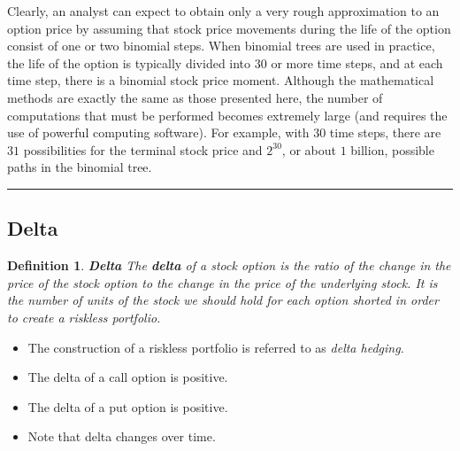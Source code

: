 \documentclass[letterpaper,10pt]{article}
\newtheorem{df}{Definition}[section]
\begin{document}
Clearly, an analyst can expect to obtain only a very rough approximation to an option price by assuming that stock price movements during the life of the option consist of one or two binomial steps. When binomial trees are used in practice, the life of the option is typically divided into $30$ or more time steps, and at each time step, there is a binomial stock price moment.  Although the mathematical methods are exactly the same as those presented here, the number of computations that must be performed becomes extremely large (and requires the use of powerful computing software).  For example, with $30$ time steps, there are $31$ possibilities for the terminal stock price and $2^{30}$, or about $1$ billion, possible paths in the binomial tree.

\bigskip

\hrule

\bigskip

\subsection{Delta}

\begin{df}{\bf Delta}
The {\bf delta} of a stock option is the ratio of the change in the price of the stock option to the change in the price of the underlying stock.  It is the number of units of the stock we should hold for each option shorted in order to create a riskless portfolio.  
\end{df}

\begin{itemize}

\item The construction of a riskless portfolio is referred to as {\em delta hedging}.

\item The delta of a call option is positive.

\item The delta of a put option is positive.

\item Note that delta changes over time.

\end{itemize}

\noindent 





 
\end{document}
